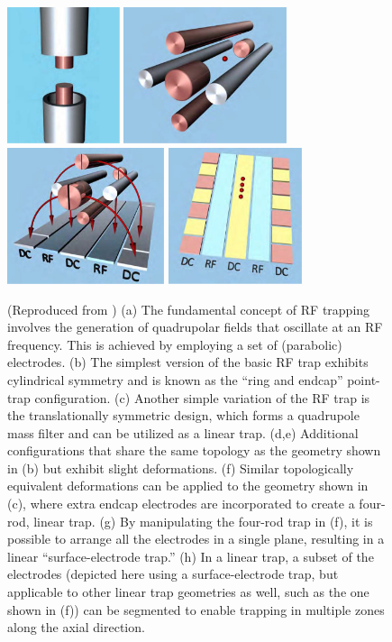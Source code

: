 \documentclass[
  journal=largetwo,
  year=2023,
]{cup-journal}
\begin{document}
\begin{figure}
  \includegraphics[height=4cm]{figs/fig1/p5_7.png}
  \includegraphics[height=4cm]{figs/fig1/p5_1.png}
  \includegraphics[height=4cm]{figs/fig1/p5_2.png}
  \includegraphics[height=4cm]{figs/fig1/p5_3.png}

  \caption{(Reproduced from \autocite{brownnutt_2015_iontrap}) (a) The fundamental concept of RF trapping involves the generation of quadrupolar fields that oscillate at an RF frequency. This is achieved by employing a set of (parabolic) electrodes. (b) The simplest version of the basic RF trap exhibits cylindrical symmetry and is known as the ``ring and endcap'' point-trap configuration. (c) Another simple variation of the RF trap is the translationally symmetric design, which forms a quadrupole mass filter and can be utilized as a linear trap. (d,e) Additional configurations that share the same topology as the geometry shown in (b) but exhibit slight deformations. (f) Similar topologically equivalent deformations can be applied to the geometry shown in (c), where extra endcap electrodes are incorporated to create a four-rod, linear trap. (g) By manipulating the four-rod trap in (f), it is possible to arrange all the electrodes in a single plane, resulting in a linear ``surface-electrode trap.'' (h) In a linear trap, a subset of the electrodes (depicted here using a surface-electrode trap, but applicable to other linear trap geometries as well, such as the one shown in (f)) can be segmented to enable trapping in multiple zones along the axial direction.}
\end{figure}
\end{document}

